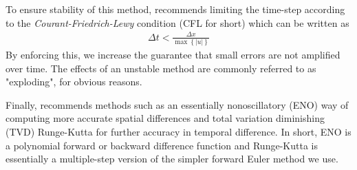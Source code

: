 To ensure stability of this method,  recommends limiting the time-step according to the \emph{Courant-Friedrich-Lewy} condition (CFL for short) which can be written as
\begin{eqnarray}
\Delta t < \frac{\Delta x}{\max \left\lbrace \left| u \right| \right\rbrace}
\end{eqnarray}
By enforcing this, we increase the guarantee that small errors are not amplified over time. The effects of an unstable method are commonly referred to as "exploding", for obvious reasons.

Finally,  recommends methods such as an essentially nonoscillatory (ENO) way of computing more accurate spatial differences and total variation diminishing (TVD) Runge-Kutta for further accuracy in temporal difference. In short, ENO is a polynomial forward or backward difference function and Runge-Kutta is essentially a multiple-step version of the simpler forward Euler method we use.
